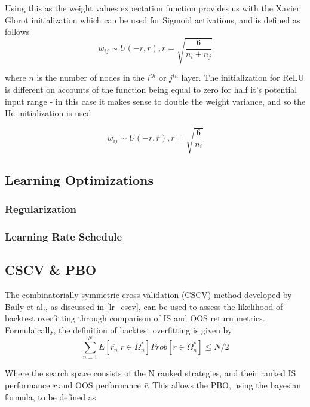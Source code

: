 \documentclass[a4paper,latin]{paper}
\begin{document}
Using this as the weight values expectation function provides us with the Xavier Glorot initialization  which can be used for Sigmoid activations, and is defined as follows
\begin{equation}
w_{ij} \sim U(-r, r), r = \sqrt{\frac{6}{n_i + n_j}}
\end{equation}

where $n$ is the number of nodes in the $i^{th}$ or $j^{th}$ layer.
\newline\newline
The initialization for ReLU is different on accounts of the function being equal to zero for half it's potential input range - in this case it makes sense to double the weight variance, and so the He  initialization is used

\begin{equation}
w_{ij} \sim U(-r, r), r = \sqrt{\frac{6}{n_i}}
\end{equation}


\subsection{Learning Optimizations}\label{imp_learningopt}

\subsubsection{Regularization}\label{imp_reg}

\subsubsection{Learning Rate Schedule}\label{imp_lrsched}

\subsection{CSCV \& PBO}\label{imp_cscv}

The  combinatorially symmetric cross-validation (CSCV) method developed by Baily et al., as discussed in \ref{lr_cscv}, can be used to assess the likelihood of backtest overfitting through comparison of IS and OOS return metrics. Formulaically, the definition of backtest overfitting is given by
\begin{equation}\label{eq:PBO1}
\sum_{n=1}^{N}E[\overline{r_n}|r\in 
\Omega_{n}^{*}]Prob[r\in\Omega_{n}^{*}]\leq{N/2}
\end{equation}

Where the search space {\textOmega} consists of the N ranked strategies, and their ranked IS performance \textit{r} and OOS performance
\textit{\={r}}. This allows the PBO, using the bayesian formula, to be defined as 
\end{document}
